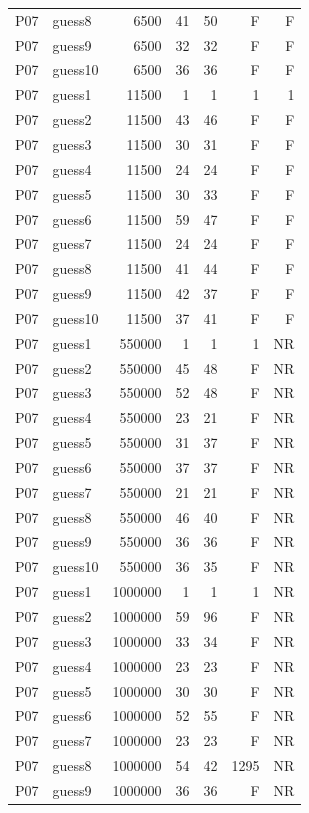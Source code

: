 {\begin{longtable}{llrrrrr}
P07 & guess8 & 6500 & 41 & 50 & F & F \\
P07 & guess9 & 6500 & 32 & 32 & F & F \\
P07 & guess10 & 6500 & 36 & 36 & F & F \\
P07 & guess1 & 11500 & 1 & 1 & 1 & 1 \\
P07 & guess2 & 11500 & 43 & 46 & F & F \\
P07 & guess3 & 11500 & 30 & 31 & F & F \\
P07 & guess4 & 11500 & 24 & 24 & F & F \\
P07 & guess5 & 11500 & 30 & 33 & F & F \\
P07 & guess6 & 11500 & 59 & 47 & F & F \\
P07 & guess7 & 11500 & 24 & 24 & F & F \\
P07 & guess8 & 11500 & 41 & 44 & F & F \\
P07 & guess9 & 11500 & 42 & 37 & F & F \\
P07 & guess10 & 11500 & 37 & 41 & F & F \\
P07 & guess1 & 550000 & 1 & 1 & 1 & NR \\
P07 & guess2 & 550000 & 45 & 48 & F & NR \\
P07 & guess3 & 550000 & 52 & 48 & F & NR \\
P07 & guess4 & 550000 & 23 & 21 & F & NR \\
P07 & guess5 & 550000 & 31 & 37 & F & NR \\
P07 & guess6 & 550000 & 37 & 37 & F & NR \\
P07 & guess7 & 550000 & 21 & 21 & F & NR \\
P07 & guess8 & 550000 & 46 & 40 & F & NR \\
P07 & guess9 & 550000 & 36 & 36 & F & NR \\
P07 & guess10 & 550000 & 36 & 35 & F & NR \\
P07 & guess1 & 1000000 & 1 & 1 & 1 & NR \\
P07 & guess2 & 1000000 & 59 & 96 & F & NR \\
P07 & guess3 & 1000000 & 33 & 34 & F & NR \\
P07 & guess4 & 1000000 & 23 & 23 & F & NR \\
P07 & guess5 & 1000000 & 30 & 30 & F & NR \\
P07 & guess6 & 1000000 & 52 & 55 & F & NR \\
P07 & guess7 & 1000000 & 23 & 23 & F & NR \\
P07 & guess8 & 1000000 & 54 & 42 & 1295 & NR \\
P07 & guess9 & 1000000 & 36 & 36 & F & NR \\

\end{longtable}}
